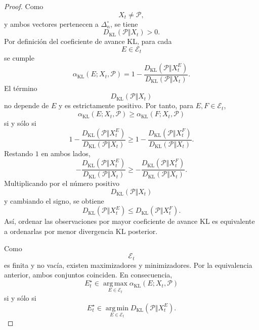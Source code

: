 ﻿\documentclass[12pt]{article}
\begin{document}
\begin{proof}
Como
\[
X_t\neq \mathcal P,
\]
y ambos vectores pertenecen a \(\Delta_n^\circ\), se tiene
\[
D_{\mathrm{KL}}(\mathcal P\Vert X_t)>0.
\]
Por definición del coeficiente de avance KL, para cada
\[
E\in\mathcal E_t
\]
se cumple
\[
\alpha_{\mathrm{KL}}(E;X_t,\mathcal P)
=
1-
\frac{
D_{\mathrm{KL}}(\mathcal P\Vert X_t^E)
}{
D_{\mathrm{KL}}(\mathcal P\Vert X_t)
}.
\]
El término
\[
D_{\mathrm{KL}}(\mathcal P\Vert X_t)
\]
no depende de \(E\) y es estrictamente positivo. Por tanto, para \(E,F\in\mathcal E_t\),
\[
\alpha_{\mathrm{KL}}(E;X_t,\mathcal P)
\geq
\alpha_{\mathrm{KL}}(F;X_t,\mathcal P)
\]
si y sólo si
\[
1-
\frac{
D_{\mathrm{KL}}(\mathcal P\Vert X_t^E)
}{
D_{\mathrm{KL}}(\mathcal P\Vert X_t)
}
\geq
1-
\frac{
D_{\mathrm{KL}}(\mathcal P\Vert X_t^F)
}{
D_{\mathrm{KL}}(\mathcal P\Vert X_t)
}.
\]
Restando \(1\) en ambos lados,
\[
-
\frac{
D_{\mathrm{KL}}(\mathcal P\Vert X_t^E)
}{
D_{\mathrm{KL}}(\mathcal P\Vert X_t)
}
\geq
-
\frac{
D_{\mathrm{KL}}(\mathcal P\Vert X_t^F)
}{
D_{\mathrm{KL}}(\mathcal P\Vert X_t)
}.
\]
Multiplicando por el número positivo
\[
D_{\mathrm{KL}}(\mathcal P\Vert X_t)
\]
y cambiando el signo, se obtiene
\[
D_{\mathrm{KL}}(\mathcal P\Vert X_t^E)
\leq
D_{\mathrm{KL}}(\mathcal P\Vert X_t^F).
\]
Así, ordenar las observaciones por mayor coeficiente de avance KL es equivalente a ordenarlas por menor divergencia KL posterior.

Como
\[
\mathcal E_t
\]
es finita y no vacía, existen maximizadores y minimizadores. Por la equivalencia anterior, ambos conjuntos coinciden. En consecuencia,
\[
E_t^\star
\in
\operatorname*{arg\,max}_{E\in\mathcal E_t}
\alpha_{\mathrm{KL}}(E;X_t,\mathcal P)
\]
si y sólo si
\[
E_t^\star
\in
\operatorname*{arg\,min}_{E\in\mathcal E_t}
D_{\mathrm{KL}}(\mathcal P\Vert X_t^E).
\]
\end{proof}
\end{document}
